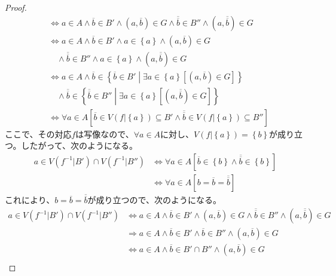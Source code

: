 \documentclass[a4paper]{jsarticle}
\begin{document}
\begin{proof}
\begin{align*}
&\Leftrightarrow a \in A \land \overline{b} \in B' \land \left( a,\overline{b} \right) \in G \land \overline{\overline{b}} \in B'' \land \left( a,\overline{\overline{b}} \right) \in G\\
&\Leftrightarrow a \in A \land \overline{b} \in B' \land a \in \left\{ a \right\} \land \left( a,\overline{b} \right) \in G \\
&\quad \land \overline{\overline{b}} \in B'' \land a \in \left\{ a \right\} \land \left( a,\overline{\overline{b}} \right) \in G\\
&\Leftrightarrow a \in A \land \overline{b} \in \left\{ \overline{b} \in B' \middle| \exists a \in \left\{ a \right\}\left[ \left( a,\overline{b} \right) \in G \right] \right\} \\
&\quad \land \overline{\overline{b}} \in \left\{ \overline{\overline{b}} \in B'' \middle| \exists a \in \left\{ a \right\}\left[ \left( a,\overline{\overline{b}} \right) \in G \right] \right\}\\
&\Leftrightarrow \forall a \in A\left[ \overline{b} \in V\left( f|\left\{ a \right\} \right) \subseteq B' \land \overline{\overline{b}} \in V\left( f|\left\{ a \right\} \right) \subseteq B'' \right]
\end{align*}
ここで、その対応$f$は写像なので、$\forall a \in A$に対し、$V\left( f|\left\{ a \right\} \right) = \left\{ b \right\}$が成り立つ。したがって、次のようになる。
\begin{align*}
a \in V\left( f^{- 1}|B' \right) \cap V\left( f^{- 1}|B'' \right) &\Leftrightarrow \forall a \in A\left[ \overline{b} \in \left\{ b \right\} \land \overline{\overline{b}} \in \left\{ b \right\} \right]\\
&\Leftrightarrow \forall a \in A\left[ b = \overline{b} = \overline{\overline{b}} \right]
\end{align*}
これにより、$b = \overline{b} = \overline{\overline{b}}$が成り立つので、次のようになる。
\begin{align*}
a \in V\left( f^{- 1}|B' \right) \cap V\left( f^{- 1}|B'' \right) &\Leftrightarrow a \in A \land \overline{b} \in B' \land \left( a,\overline{b} \right) \in G \land \overline{\overline{b}} \in B'' \land \left( a,\overline{\overline{b}} \right) \in G\\
&\Rightarrow a \in A \land \overline{b} \in B' \land \overline{b} \in B'' \land \left( a,\overline{b} \right) \in G\\
&\Leftrightarrow a \in A \land \overline{b} \in B' \cap B'' \land \left( a,\overline{b} \right) \in G\\

\end{align*}
\end{proof}
\end{document}
